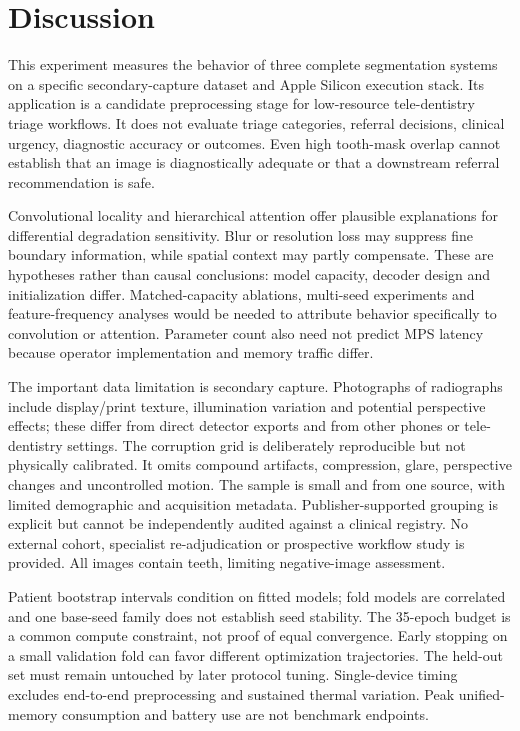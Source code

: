 \documentclass[11pt]{article}
\begin{document}
\section{Discussion}
This experiment measures the behavior of three complete segmentation systems on a specific secondary-capture dataset and Apple Silicon execution stack. Its application is a candidate preprocessing stage for low-resource tele-dentistry triage workflows. It does not evaluate triage categories, referral decisions, clinical urgency, diagnostic accuracy or outcomes. Even high tooth-mask overlap cannot establish that an image is diagnostically adequate or that a downstream referral recommendation is safe.

Convolutional locality and hierarchical attention offer plausible explanations for differential degradation sensitivity. Blur or resolution loss may suppress fine boundary information, while spatial context may partly compensate. These are hypotheses rather than causal conclusions: model capacity, decoder design and initialization differ. Matched-capacity ablations, multi-seed experiments and feature-frequency analyses would be needed to attribute behavior specifically to convolution or attention. Parameter count also need not predict MPS latency because operator implementation and memory traffic differ.

The important data limitation is secondary capture. Photographs of radiographs include display/print texture, illumination variation and potential perspective effects; these differ from direct detector exports and from other phones or tele-dentistry settings. The corruption grid is deliberately reproducible but not physically calibrated. It omits compound artifacts, compression, glare, perspective changes and uncontrolled motion. The sample is small and from one source, with limited demographic and acquisition metadata. Publisher-supported grouping is explicit but cannot be independently audited against a clinical registry. No external cohort, specialist re-adjudication or prospective workflow study is provided. All images contain teeth, limiting negative-image assessment.

Patient bootstrap intervals condition on fitted models; fold models are correlated and one base-seed family does not establish seed stability. The 35-epoch budget is a common compute constraint, not proof of equal convergence. Early stopping on a small validation fold can favor different optimization trajectories. The held-out set must remain untouched by later protocol tuning. Single-device timing excludes end-to-end preprocessing and sustained thermal variation. Peak unified-memory consumption and battery use are not benchmark endpoints.
\end{document}
